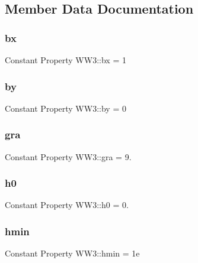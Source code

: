 \subsection{Member Data Documentation}
\mbox{\label{class_w_w3_a8ef36fc579e1e817a898fab1bfadca7c}} 
\subsubsection{\texorpdfstring{bx}{bx}}
{\footnotesize\ttfamily Constant Property W\+W3\+::bx = 1}

\mbox{\label{class_w_w3_a46674762f9b334d5a34905879b262174}} 
\subsubsection{\texorpdfstring{by}{by}}
{\footnotesize\ttfamily Constant Property W\+W3\+::by = 0}

\mbox{\label{class_w_w3_a11e02c8db208c03adc58d26c934ad8a3}} 
\subsubsection{\texorpdfstring{gra}{gra}}
{\footnotesize\ttfamily Constant Property W\+W3\+::gra = 9.}

\mbox{\label{class_w_w3_a90b8a7e997c8962ab51d2fe4b0977bad}} 
\subsubsection{\texorpdfstring{h0}{h0}}
{\footnotesize\ttfamily Constant Property W\+W3\+::h0 = 0.}

\mbox{\label{class_w_w3_a8e141d1da6f3f16f64c1258d1677b175}} 
\subsubsection{\texorpdfstring{hmin}{hmin}}
{\footnotesize\ttfamily Constant Property W\+W3\+::hmin = 1e}

